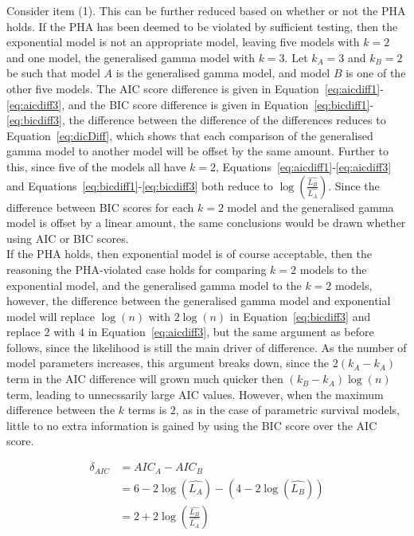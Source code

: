 Consider item (1). This can be further reduced based on whether or not the PHA holds. If the PHA has been deemed to be violated by sufficient testing, then the exponential model is not an appropriate model, leaving five models with $k = 2$ and one model, the generalised gamma model with $k = 3$. Let $k_A = 3$ and $k_B = 2$ be such that model $A$ is the generalised gamma model, and model $B$ is one of the other five models. The AIC score difference is given in Equation~\ref{eq:aicdiff1}-\ref{eq:aicdiff3}, and the BIC score difference is given in Equation~\ref{eq:bicdiff1}-\ref{eq:bicdiff3}, the difference between the difference of the differences reduces to  Equation~\ref{eq:dicDiff}, which shows that each comparison of the generalised gamma model to another model will be offset by the same amount. Further to this, since five of the models all have $k = 2$, Equations~\ref{eq:aicdiff1}-\ref{eq:aicdiff3} and Equations~\ref{eq:bicdiff1}-\ref{eq:bicdiff3} both reduce to $\log\left(\frac{\hat{L_B}}{\hat{L_A}}\right)$. Since the difference between BIC scores for each $k = 2$ model and the generalised gamma model is offset by a linear amount, the same conclusions would be drawn whether using AIC or BIC scores. \\

If the PHA holds, then exponential model is of course acceptable, then the reasoning the PHA-violated case holds for comparing $k = 2$ models to the exponential model, and the generalised gamma model to the $k = 2$ models, however, the difference between the generalised gamma model and exponential model will replace $\log(n)$ with $2\log(n)$ in Equation~\ref{eq:bicdiff3} and replace $2$ with $4$ in Equation~\ref{eq:aicdiff3}, but the same argument as before follows, since the likelihood is still the main driver of difference. As the number of model parameters increases, this argument breaks down, since the $2(k_A - k_A)$ term in the AIC difference will grown much quicker then $(k_B-k_A)\log(n)$ term, leading to unnecssarily large AIC values. However, when the maximum difference between the $k$ terms is $2$, as in the case of parametric survival models, little to no extra information is gained by using the BIC score over the AIC score. 

\begin{align}
    \delta_{AIC} &= AIC_A - AIC_B \label{eq:aicdiff1}\\
           &= 6 - 2\log(\hat{L_A}) - (4 - 2\log(\hat{L_B})) \\
           &= 2 + 2\log\left(\frac{\hat{L_B}}{\hat{L_A}}\right) \label{eq:aicdiff3}
\end{align}

